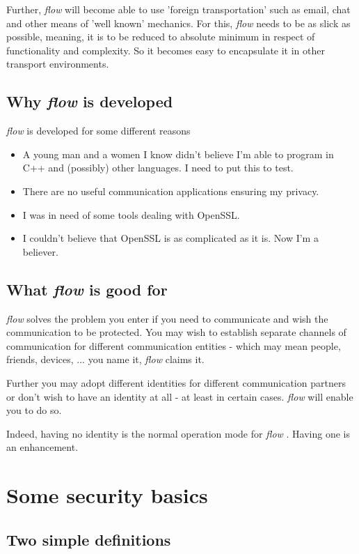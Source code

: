 \documentclass[twoside,a4paper,english,12pt,authoryear,openright]{book}
\newcommand{\flow}{\textit{flow} }
\begin{document}
Further, \flow will become able to use 'foreign transportation' such as email, chat and other means of 'well known' mechanics. For this, \flow needs to be as slick as possible, meaning, it is to be reduced to absolute minimum in respect of functionality and complexity. So it becomes easy to encapsulate it in other transport environments.

\subsection{Why \flow is developed}

\flow is developed for some different reasons

\begin{itemize}
  \item {A young man and a women I know didn't believe I'm able to program in C++ and (possibly) other languages. I need to put this to test.}
  \item {There are no useful communication applications ensuring my privacy.}
  \item {I was in need of some tools dealing with OpenSSL.}
  \item {I couldn't believe that OpenSSL is as complicated as it is. Now I'm a believer.}
\end{itemize}

\subsection{What \flow is good for}

\flow solves the problem you enter if you need to communicate and wish the communication to be protected. You may wish to establish separate channels of communication for different communication entities - which may mean people, friends, devices, ... you name it, \flow claims it.

Further you may adopt different identities for different communication partners or don't wish to have an identity at all - at least in certain cases. \flow will enable you to do so.

Indeed, having no identity is the normal operation mode for \flow. Having one is an enhancement.


\section{Some security basics}

\subsection{Two simple definitions}
\end{document}
